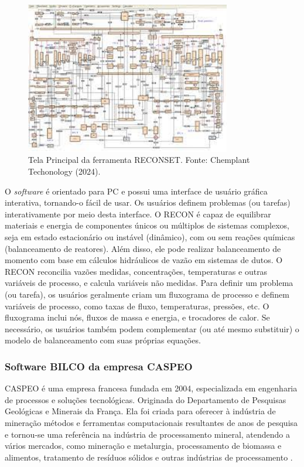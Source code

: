 \begin{figure}[htbp!]
	\centering
	\includegraphics[width=0.8\textwidth]{figuras/RECONSET.jpg}
	\caption{Tela Principal da ferramenta RECONSET. Fonte: Chemplant Techonology (2024).}
	\label{fig:RECONSET}
\end{figure}

O \textit{software} é orientado para PC e possui uma interface de usuário gráfica interativa, tornando-o fácil de usar. Os usuários definem problemas (ou tarefas) interativamente por meio desta interface. O RECON é capaz de equilibrar materiais e energia de componentes únicos ou múltiplos de sistemas complexos, seja em estado estacionário ou instável (dinâmico), com ou sem reações químicas (balanceamento de reatores). Além disso, ele pode realizar balanceamento de momento com base em cálculos hidráulicos de vazão em sistemas de dutos. O RECON reconcilia vazões medidas, concentrações, temperaturas e outras variáveis de processo, e calcula variáveis não medidas. Para definir um problema (ou tarefa), os usuários geralmente criam um fluxograma de processo e definem variáveis de processo, como taxas de fluxo, temperaturas, pressões, etc. O fluxograma inclui nós, fluxos de massa e energia, e trocadores de calor. Se necessário, os usuários também podem complementar (ou até mesmo substituir) o modelo de balanceamento com suas próprias equações.

\subsubsection{Software BILCO da empresa CASPEO}

CASPEO é uma empresa francesa fundada em 2004, especializada em engenharia de processos e soluções tecnológicas. Originada do Departamento de Pesquisas Geológicas e Minerais da França. Ela foi criada para oferecer à indústria de mineração métodos e ferramentas computacionais resultantes de anos de pesquisa e tornou-se uma referência na indústria de processamento mineral, atendendo a vários mercados, como mineração e metalurgia, processamento de biomassa e alimentos, tratamento de resíduos sólidos e outras indústrias de processamento \cite{bilco}.

